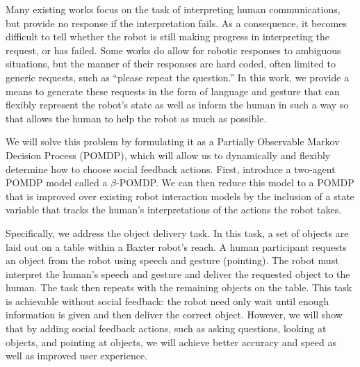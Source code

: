 \documentclass[conference]{IEEEtran}
\begin{document}
Many existing works focus on the task of interpreting human communications\citep{tellex11,matuszek12,tellex12,misra14}, but provide no response if the interpretation fails. As a consequence, it becomes difficult to tell whether the robot is still making progress in interpreting the request, or has failed. Some works do allow for robotic responses to ambiguous situations, but the manner of their responses are hard coded, often limited to generic requests, such as ``please repeat the question.'' In this work, we provide a means to generate these requests in the form of language and gesture that can flexibly represent the robot's state as well as inform the human in such a way so that allows the human to help the robot as much as possible. 


We will solve this problem by formulating it as a Partially Observable Markov Decision Process (POMDP)\citep{kaelbling99}, which will allow us to dynamically and flexibly determine how to choose social feedback actions. First, introduce a two-agent POMDP model called a $\beta$-POMDP. We can then reduce this model to a POMDP that is improved over existing robot interaction models by the inclusion of a state variable that tracks the human's interpretations of the actions the robot takes. 

Specifically, we address the object delivery task. In this task, a set of objects are laid out on a table within a Baxter robot's reach. A human participant requests an object from the robot using speech and gesture (pointing). The robot must interpret the human's speech and gesture and deliver the requested object to the human. The task then repeats with the remaining objects on the table. This task is achievable without social feedback: the robot need only wait until enough information is given and then deliver the correct object. However, we will show that by adding social feedback actions, such as asking questions, looking at objects, and pointing at objects, we will achieve better accuracy and speed as well as improved user experience. 
\end{document}
